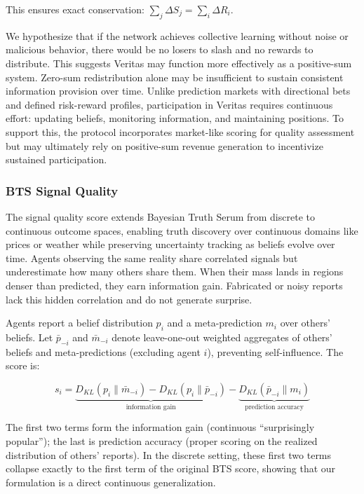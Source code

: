 \documentclass[11pt,a4paper]{article}
\begin{document}
This ensures exact conservation: $\sum_j \Delta S_j = \sum_i \Delta R_i$.

We hypothesize that if the network achieves collective learning without noise or malicious behavior, there would be no losers to slash and no rewards to distribute. This suggests Veritas may function more effectively as a positive-sum system. Zero-sum redistribution alone may be insufficient to sustain consistent information provision over time. Unlike prediction markets with directional bets and defined risk-reward profiles, participation in Veritas requires continuous effort: updating beliefs, monitoring information, and maintaining positions. To support this, the protocol incorporates market-like scoring for quality assessment but may ultimately rely on positive-sum revenue generation to incentivize sustained participation.

\subsubsection*{BTS Signal Quality}

The signal quality score extends Bayesian Truth Serum from discrete to continuous outcome spaces, enabling truth discovery over continuous domains like prices or weather while preserving uncertainty tracking as beliefs evolve over time. Agents observing the same reality share correlated signals but underestimate how many others share them. When their mass lands in regions denser than predicted, they earn information gain. Fabricated or noisy reports lack this hidden correlation and do not generate surprise.

Agents report a belief distribution $p_i$ and a meta-prediction $m_i$ over others' beliefs. Let $\bar{p}_{-i}$ and $\bar{m}_{-i}$ denote leave-one-out weighted aggregates of others' beliefs and meta-predictions (excluding agent $i$), preventing self-influence. The score is:

$$s_i = \underbrace{D_{KL}(p_i \| \bar{m}_{-i}) - D_{KL}(p_i \| \bar{p}_{-i})}_{\text{information gain}} - \underbrace{D_{KL}(\bar{p}_{-i} \| m_i)}_{\text{prediction accuracy}}$$

The first two terms form the information gain (continuous ``surprisingly popular''); the last is prediction accuracy (proper scoring on the realized distribution of others' reports). In the discrete setting, these first two terms collapse exactly to the first term of the original BTS score, showing that our formulation is a direct continuous generalization.
\end{document}
